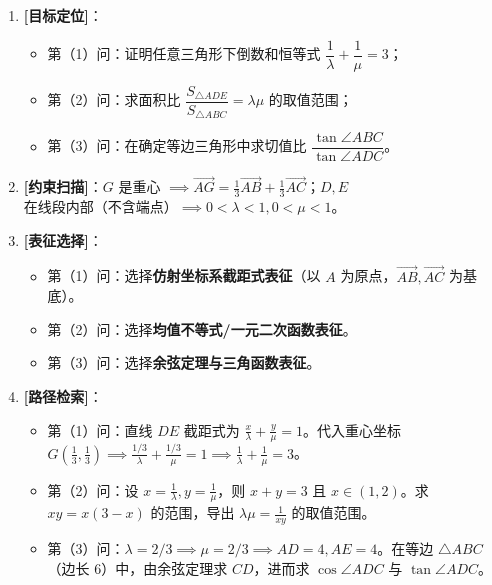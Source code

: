 \documentclass[11pt,a4paper,fontset=fandol]{ctexart}
\newcommand{\vect}[1]{\overrightarrow{#1}}
\begin{document}
\medskip
\begin{tcolorbox}[colback=gray!4,colframe=ink!70,boxrule=0.7pt,arc=1mm,before skip=6pt,after skip=6pt,top=4pt,bottom=4pt,title=\textbf{决策路线}]
\begin{enumerate}[label=\textbf{\arabic*\ },leftmargin=1.8em]
  \item \textbf{[目标定位]}：
    \begin{itemize}
      \item 第（1）问：证明任意三角形下倒数和恒等式 \(\dfrac{1}{\lambda} + \dfrac{1}{\mu} = 3\)；
      \item 第（2）问：求面积比 \(\dfrac{S_{\triangle ADE}}{S_{\triangle ABC}} = \lambda\mu\) 的取值范围；
      \item 第（3）问：在确定等边三角形中求切值比 \(\dfrac{\tan\angle ABC}{\tan\angle ADC}\)。
    \end{itemize}
  \item \textbf{[约束扫描]}：\(G\) 是重心 \(\implies \vect{AG} = \frac{1}{3}\vect{AB} + \frac{1}{3}\vect{AC}\)；\(D, E\) 在线段内部（不含端点）\(\implies 0 < \lambda < 1, 0 < \mu < 1\)。
  \item \textbf{[表征选择]}：
    \begin{itemize}
      \item 第（1）问：选择\textbf{仿射坐标系截距式表征}（以 \(A\) 为原点，\(\vect{AB}, \vect{AC}\) 为基底）。
      \item 第（2）问：选择\textbf{均值不等式/一元二次函数表征}。
      \item 第（3）问：选择\textbf{余弦定理与三角函数表征}。
    \end{itemize}
  \item \textbf{[路径检索]}：
    \begin{itemize}
      \item 第（1）问：直线 \(DE\) 截距式为 \(\frac{x}{\lambda} + \frac{y}{\mu} = 1\)。代入重心坐标 \(G\left(\frac{1}{3}, \frac{1}{3}\right) \implies \frac{1/3}{\lambda} + \frac{1/3}{\mu} = 1 \implies \frac{1}{\lambda} + \frac{1}{\mu} = 3\)。
      \item 第（2）问：设 \(x = \frac{1}{\lambda}, y = \frac{1}{\mu}\)，则 \(x+y=3\) 且 \(x \in (1,2)\)。求 \(xy = x(3-x)\) 的范围，导出 \(\lambda\mu = \frac{1}{xy}\) 的取值范围。
      \item 第（3）问：\(\lambda = 2/3 \implies \mu = 2/3 \implies AD = 4, AE = 4\)。在等边 \(\triangle ABC\)（边长 6）中，由余弦定理求 \(CD\)，进而求 \(\cos\angle ADC\) 与 \(\tan\angle ADC\)。
    \end{itemize}

\end{enumerate}
\end{tcolorbox}
\end{document}
